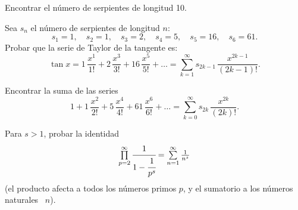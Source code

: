 \documentclass[12pt, spanish]{article}  %
\begin{document}

\medskip
\noindent 
Encontrar el n\'umero de serpientes de longitud 10.

\bigskip
{} Sea $s_n$ el n\'umero de serpientes de longitud $n$:
$$
s_1=1, \quad s_2=1, \quad s_3=2, \quad s_4=5, \quad s_5=16, \quad s_6=61.
$$
Probar que la serie de Taylor de la tangente es:
$$
\tan x=1\, \frac{x^1}{1!}+2\, \frac{x^3}{3!}+16\, \frac{x^5}{5!}+\dots=
\textstyle\sum\limits_{k=1}^{\infty} s_{2k-1}\, \frac{x^{2k-1}}{(2k-1)!}.
$$
 

\bigskip
{} Encontrar la suma de las series
$$
1+1\, \frac{x^2}{2!}+5\, \frac{x^4}{4!}+61\, \frac{x^6}{6!}+\dots=
\textstyle\sum\limits_{k=0}^{\infty} s_{2k}\,\frac{x^{2k}}{(2k)!}.
$$

\bigskip
{} Para $s>1$, probar la identidad
$$
\textstyle\prod\limits_{p=2}^{\infty} \cfrac{1}{1-\cfrac{1}{p^s}}=\sum\limits_{n=1}^{\infty} \frac{1}{n^s}
$$ 
(el producto afecta a todos los n\'umeros primos $p$, y el sumatorio a los n\'umeros naturales ~$n$).
\end{document}
